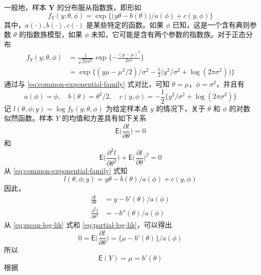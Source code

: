 \documentclass[12pt,a4paper,UTF8,twoside]{book}
\theoremstyle{definition}
\theoremstyle{definition}
\theoremstyle{definition}
\theoremstyle{remark}
\begin{document}
一般地，样本 \(\mathbf{Y}\) 的分布服从指数族，即形如 \begin{equation}
f_{Y}(y;\theta,\phi) = \exp\big\{ \big(y\theta - b(\theta) \big)/a(\phi) + c(y,\phi) \big\}
\label{eq:common-exponential-family}
\end{equation} \noindent 其中，\(a(\cdot),b(\cdot),c(\cdot)\)
是某些特定的函数。如果 \(\phi\) 已知，这是一个含有典则参数 \(\theta\)
的指数族模型，如果 \(\phi\)
未知，它可能是含有两个参数的指数族。对于正态分布 \begin{equation}
\begin{aligned}
f_{Y}(y;\theta,\phi) & = \frac{1}{\sqrt{2\pi\sigma^2}} \exp\{-\frac{(y - \mu)^2}{2\sigma^2}  \}  \\
 & = \exp\big \{ (y\mu - \mu^2/2)/\sigma^2 - \frac{1}{2}\big(y^2/\sigma^2 + \log(2\pi\sigma^2)\big) \big\}
\end{aligned} \label{eq:normal-distribution}
\end{equation} \noindent 通过与 \eqref{eq:common-exponential-family}
式对比，可知 \(\theta = \mu\)，\(\phi = \sigma^2\)，并且有 \[
a(\phi) = \phi, \quad b(\theta) = \theta^2/2, \quad c(y,\phi) = - \frac{1}{2}\{ y^2/\sigma^2 + \log(2\pi\sigma^2) \} 
\] \noindent 记 \(l(\theta,\phi;y) = \log f_{Y}(y;\theta,\phi)\)
为给定样本点 \(y\) 的情况下，关于 \(\theta\) 和 \(\phi\)
的对数似然函数。样本 \(Y\) 的均值和方差具有如下关系 \begin{equation}
\mathsf{E}\big( \frac{\partial l}{\partial \theta} \big) = 0
\label{eq:mean-log-lik}
\end{equation} \noindent 和 \begin{equation}
\mathsf{E}\big( \frac{\partial^2 l}{\partial \theta^2} \big) + \mathsf{E}\big(\frac{\partial l}{\partial \theta}\big)^2  = 0
\label{eq:variance-log-lik}
\end{equation} \noindent 从 \eqref{eq:common-exponential-family} 式知
\[ l(\theta,\phi;y) = {y\theta - b(\theta)}/a(\phi) + c(y,\phi) \]
\noindent 因此， \begin{equation}
\begin{aligned}
\frac{\partial l}{\partial \theta} & = {y - b'(\theta)}/a(\phi)  \\
\frac{\partial^2 l}{\partial \theta^2}  & = - b''(\theta)/a(\phi)
\end{aligned} \label{eq:partial-log-lik}
\end{equation} \noindent 从 \eqref{eq:mean-log-lik} 式和
\eqref{eq:partial-log-lik}，可以得出 \[ 
0 = \mathsf{E}\big( \frac{\partial l}{\partial \theta} \big) = \big\{ \mu - b'(\theta) \big\}/a(\phi)
\] \noindent 所以 \[ \mathsf{E}(Y) = \mu = b'(\theta) \] \noindent 根据
\end{document}
